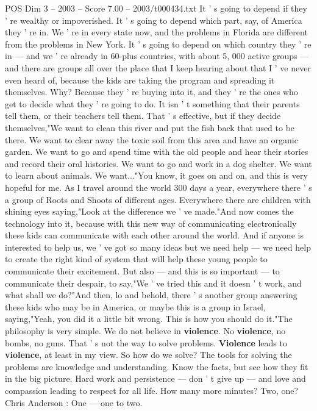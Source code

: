 \begin{textsample}{POS Dim 3 – 2003 – Score 7.00 – 2003/t000434.txt}
It ' s going to depend if they ' re wealthy or impoverished.
It ' s going to depend which part, say, of America they ' re in.
We ' re in every state now, and the problems in Florida are different from the problems in New York.
It ' s going to depend on which country they ' re in — and we ' re already in 60-plus countries, with about 5, 000 active groups — and there are groups all over the place that I keep hearing about that I ' ve never even heard of, because the kids are taking the program and spreading it themselves.
Why?
Because they ' re buying into it, and they ' re the ones who get to decide what they ' re going to do.
It isn ' t something that their parents tell them, or their teachers tell them.
That ' s effective, but if they decide themselves,"We want to clean this river and put the fish back that used to be there.
We want to clear away the toxic soil from this area and have an organic garden.
We want to go and spend time with the old people and hear their stories and record their oral histories.
We want to go and work in a dog shelter.
We want to learn about animals.
We want..."You know, it goes on and on, and this is very hopeful for me.
As I travel around the world 300 days a year, everywhere there ' s a group of Roots and Shoots of different ages.
Everywhere there are children with shining eyes saying,"Look at the difference we ' ve made."And now comes the technology into it, because with this new way of communicating electronically these kids can communicate with each other around the world.
And if anyone is interested to help us, we ' ve got so many ideas but we need help — we need help to create the right kind of system that will help these young people to communicate their excitement.
But also — and this is so important — to communicate their despair, to say,"We ' ve tried this and it doesn ' t work, and what shall we do?"And then, lo and behold, there ' s another group answering these kids who may be in America, or maybe this is a group in Israel, saying,"Yeah, you did it a little bit wrong.
This is how you should do it."The philosophy is very simple.
We do not believe in \textbf{violence}.
No \textbf{violence}, no bombs, no guns.
That ' s not the way to solve problems. \textbf{Violence} leads to \textbf{violence}, at least in my view.
So how do we solve?
The tools for solving the problems are knowledge and understanding.
Know the facts, but see how they fit in the big picture.
Hard work and persistence — don ' t give up — and love and compassion leading to respect for all life.
How many more minutes?
Two, one?
Chris Anderson : One — one to two.

\end{textsample}
